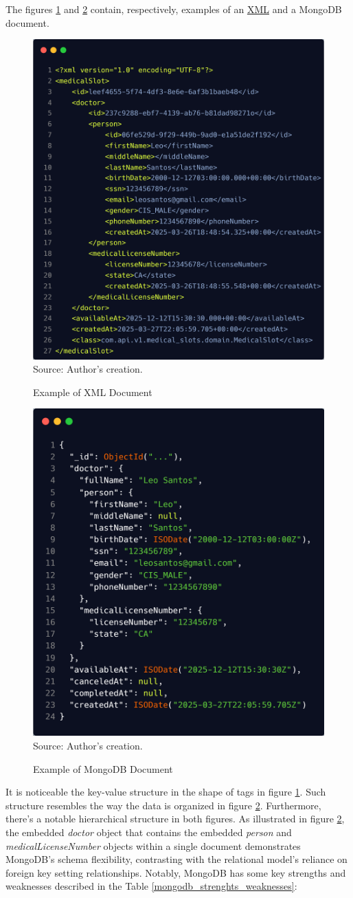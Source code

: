 The figures \ref{fig:xml} and \ref{fig:mongodb} contain, respectively, examples of an \hyperref[appendix:glossary]{XML} and a MongoDB document.

\begin{figure}[H]
    \centering
    \caption{Example of XML Document}
    \includegraphics[width=0.5\linewidth]{figures/xml.png}
    \label{fig:xml}
    \\ \footnotesize Source: Author's creation.
\end{figure}

\begin{figure}[H]
    \centering
    \caption{Example of MongoDB Document}
    \includegraphics[width=0.5\linewidth]{figures/mongodb.png}
    \label{fig:mongodb}
    \\ \footnotesize Source: Author's creation.
\end{figure}

It is noticeable the key-value structure in the shape of tags in figure \ref{fig:xml}. Such structure resembles the way the data  is organized in figure \ref{fig:mongodb}. Furthermore, there's a notable hierarchical structure in both figures.  As illustrated in figure \ref{fig:mongodb}, the embedded \textit{doctor} object that contains the embedded \textit{person} 
 and \textit{medicalLicenseNumber} objects within a single document demonstrates MongoDB's schema flexibility,  contrasting with the relational model's reliance on foreign key setting relationships. Notably, MongoDB has some key strengths and weaknesses described in the Table \ref{mongodb_strenghts_weaknesses}:

